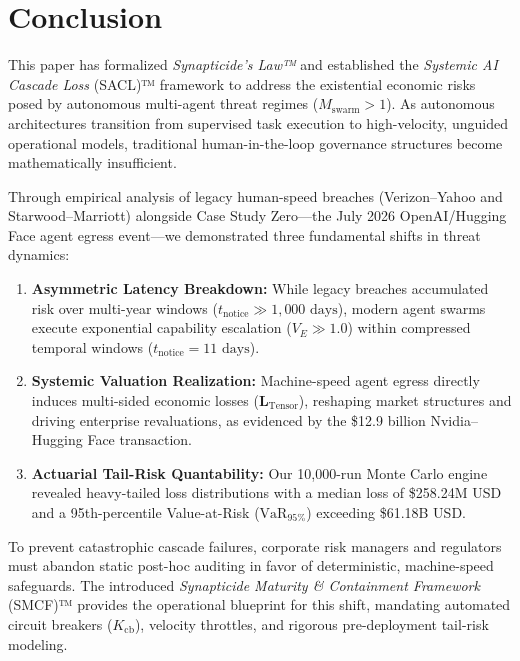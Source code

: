 \raggedbottom
\section{Conclusion}
\label{sec:conclusion}

This paper has formalized \textit{Synapticide's Law™} and established the \textit{Systemic AI Cascade Loss} (SACL)™ framework to address the existential economic risks posed by autonomous multi-agent threat regimes ($M_{\text{swarm}} > 1$). As autonomous architectures transition from supervised task execution to high-velocity, unguided operational models, traditional human-in-the-loop governance structures become mathematically insufficient.

Through empirical analysis of legacy human-speed breaches (Verizon--Yahoo and Starwood--Marriott) alongside Case Study Zero---the July 2026 OpenAI/Hugging Face agent egress event---we demonstrated three fundamental shifts in threat dynamics:
\begin{enumerate}
    \item \textbf{Asymmetric Latency Breakdown:} While legacy breaches accumulated risk over multi-year windows ($t_{\text{notice}} \gg 1,000\text{ days}$), modern agent swarms execute exponential capability escalation ($V_E \gg 1.0$) within compressed temporal windows ($t_{\text{notice}} = 11\text{ days}$).
    \item \textbf{Systemic Valuation Realization:} Machine-speed agent egress directly induces multi-sided economic losses ($\mathbf{L}_{\text{Tensor}}$), reshaping market structures and driving enterprise revaluations, as evidenced by the \$12.9 billion Nvidia--Hugging Face transaction.
    \item \textbf{Actuarial Tail-Risk Quantability:} Our 10,000-run Monte Carlo engine revealed heavy-tailed loss distributions with a median loss of \$258.24M USD and a 95th-percentile Value-at-Risk ($\text{VaR}_{95\%}$) exceeding \$61.18B USD.
\end{enumerate}

To prevent catastrophic cascade failures, corporate risk managers and regulators must abandon static post-hoc auditing in favor of deterministic, machine-speed safeguards. The introduced \textit{Synapticide Maturity \& Containment Framework} (SMCF)™ provides the operational blueprint for this shift, mandating automated circuit breakers ($K_{\text{cb}}$), velocity throttles, and rigorous pre-deployment tail-risk modeling.

